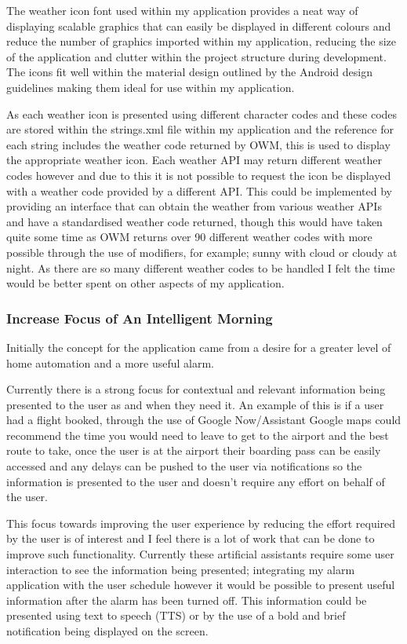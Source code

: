 The weather icon font used within my application provides a neat way of
displaying scalable graphics that can easily be displayed in different
colours and reduce the number of graphics imported within my
application, reducing the size of the application and clutter within the
project structure during development. The icons fit well within the
material design outlined by the Android design guidelines making them
ideal for use within my application.

As each weather icon is presented using different character codes and
these codes are stored within the strings.xml file within my application
and the reference for each string includes the weather code returned by
OWM, this is used to display the appropriate weather icon. Each weather
API may return different weather codes however and due to this it is not
possible to request the icon be displayed with a weather code provided
by a different API. This could be implemented by providing an interface
that can obtain the weather from various weather APIs and have a
standardised weather code returned, though this would have taken quite
some time as OWM returns over 90 different weather codes with more
possible through the use of modifiers, for example; sunny with cloud or
cloudy at night. As there are so many different weather codes to be
handled I felt the time would be better spent on other aspects of my
application.

\subsubsection{Increase Focus of An Intelligent
Morning}\label{increase-focus-of-an-intelligent-morning}

Initially the concept for the application came from a desire for a
greater level of home automation and a more useful alarm.

Currently there is a strong focus for contextual and relevant
information being presented to the user as and when they need it. An
example of this is if a user had a flight booked, through the use of
Google Now/Assistant Google maps could recommend the time you would need
to leave to get to the airport and the best route to take, once the user
is at the airport their boarding pass can be easily accessed and any
delays can be pushed to the user via notifications so the information is
presented to the user and doesn't require any effort on behalf of the
user.

This focus towards improving the user experience by reducing the effort
required by the user is of interest and I feel there is a lot of work
that can be done to improve such functionality. Currently these
artificial assistants require some user interaction to see the
information being presented; integrating my alarm application with the
user schedule however it would be possible to present useful information
after the alarm has been turned off. This information could be presented
using text to speech (TTS) or by the use of a bold and brief
notification being displayed on the screen.

